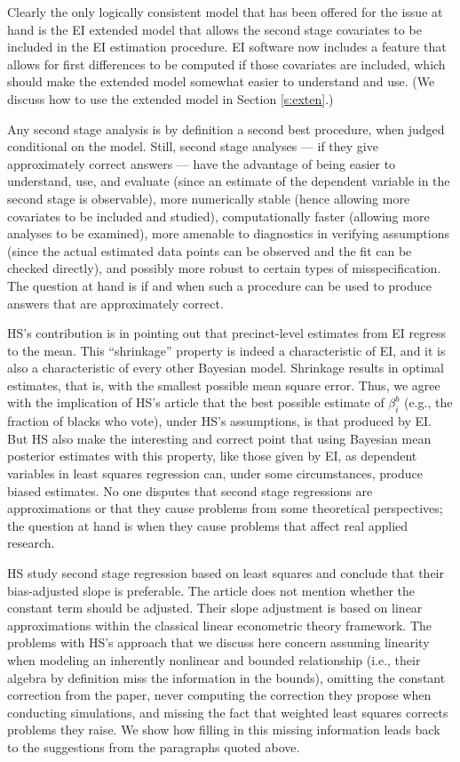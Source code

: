 \documentclass[11pt,titlepage]{article}
\begin{document}
Clearly the only logically consistent model that has been offered for
the issue at hand is the EI extended model that allows the second
stage covariates to be included in the EI estimation procedure.  EI
software now includes a feature that allows for first differences to
be computed if those covariates are included, which should make the
extended model somewhat easier to understand and use.  (We discuss how
to use the extended model in Section \ref{s:exten}.)

Any second stage analysis is by definition a second best procedure,
when judged conditional on the model.  Still, second stage analyses
--- if they give approximately correct answers --- have the advantage
of being easier to understand, use, and evaluate (since an estimate of
the dependent variable in the second stage is observable), more
numerically stable (hence allowing more covariates to be included and
studied), computationally faster (allowing more analyses to be
examined), more amenable to diagnostics in verifying assumptions
(since the actual estimated data points can be observed and the fit
can be checked directly), and possibly more robust to certain types of
misspecification.  The question at hand is if and when such a
procedure can be used to produce answers that are approximately
correct.

HS's contribution is in pointing out that precinct-level estimates
from EI regress to the mean.  This ``shrinkage'' property is indeed a
characteristic of EI, and it is also a characteristic of every other
Bayesian model.  Shrinkage results in optimal estimates, that is, with
the smallest possible mean square error.  Thus, we agree with the
implication of HS's article that the best possible estimate of
$\beta_i^b$ (e.g., the fraction of blacks who vote), under HS's
assumptions, is that produced by EI.  But HS also make the interesting
and correct point that using Bayesian mean posterior estimates with
this property, like those given by EI, as dependent variables in least
squares regression can, under some circumstances, produce biased
estimates.  No one disputes that second stage regressions are
approximations or that they cause problems from some theoretical
perspectives; the question at hand is when they cause problems that
affect real applied research.

HS study second stage regression based on least squares and conclude
that their bias-adjusted slope is preferable.  The article does not
mention whether the constant term should be adjusted.  Their slope
adjustment is based on linear approximations within the classical
linear econometric theory framework.  The problems with HS's approach
that we discuss here concern assuming linearity when modeling an
inherently nonlinear and bounded relationship (i.e., their algebra by
definition miss the information in the bounds), omitting the constant
correction from the paper, never computing the correction they propose
when conducting simulations, and missing the fact that weighted least
squares corrects problems they raise.  We show how filling in this
missing information leads back to the suggestions from the paragraphs
quoted above.
\end{document}
